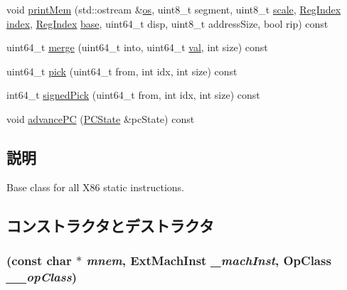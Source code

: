 \begin{DoxyCompactItemize}
\item 
void \hyperlink{classX86ISA_1_1X86StaticInst_ae9a7538eaca0077092eb5a0c2f811770}{printMem} (std::ostream \&\hyperlink{namespaceX86ISA_a6b6e6ba763e7eaf46ac5b6372ca98d30}{os}, uint8\_\-t segment, uint8\_\-t \hyperlink{namespaceX86ISA_acec6d8ad52a28972fa74e071c1a63b6a}{scale}, \hyperlink{classStaticInst_a36d25e03e43fa3bb4c5482cbefe5e0fb}{RegIndex} \hyperlink{namespaceX86ISA_aa7f971ede8ba06dbd8a605007eda1c6f}{index}, \hyperlink{classStaticInst_a36d25e03e43fa3bb4c5482cbefe5e0fb}{RegIndex} \hyperlink{namespaceX86ISA_a22fd87812cbb48f6d80b6cc7957490cf}{base}, uint64\_\-t disp, uint8\_\-t addressSize, bool rip) const 
\item 
uint64\_\-t \hyperlink{classX86ISA_1_1X86StaticInst_a8063d634cde6ed5d0467b01364cb6df3}{merge} (uint64\_\-t into, uint64\_\-t \hyperlink{namespaceX86ISA_ae13bf1250853ff6b72aabe3c79b587cc}{val}, int size) const 
\item 
uint64\_\-t \hyperlink{classX86ISA_1_1X86StaticInst_a738817873fb5a0a17a835ab025905a25}{pick} (uint64\_\-t from, int idx, int size) const 
\item 
int64\_\-t \hyperlink{classX86ISA_1_1X86StaticInst_a25c7db2a9cdba1e14cbc6eaf3acb6d33}{signedPick} (uint64\_\-t from, int idx, int size) const 
\item 
void \hyperlink{classX86ISA_1_1X86StaticInst_af04cd01429462d48e635f3e01ced6257}{advancePC} (\hyperlink{classX86ISA_1_1PCState}{PCState} \&pcState) const 
\end{DoxyCompactItemize}


\subsection{説明}
Base class for all X86 static instructions. 

\subsection{コンストラクタとデストラクタ}
\hypertarget{classX86ISA_1_1X86StaticInst_a2feb4b016c2dd165d76bbbb6064dfe43}{
\subsubsection[{X86StaticInst}]{ (const char $\ast$ {\em mnem}, \/  {\bf ExtMachInst} {\em \_\-machInst}, \/  OpClass {\em \_\-\_\-opClass})}}
\label{classX86ISA_1_1X86StaticInst_a2feb4b016c2dd165d76bbbb6064dfe43}



